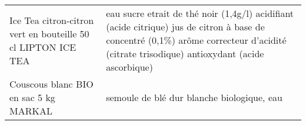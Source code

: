 \begin{longtable}{p{5cm}p{10cm}}
                                             Ice Tea citron-citron vert en bouteille 50 cl LIPTON ICE TEA &                                                                                                                                                                                                                                                                                                                                                                                                                                                                                                                                                                                                                                                                                                                                                                                                                                         eau  sucre  etrait de thé noir (1,4g/l)  acidifiant (acide citrique)  jus de citron à base de concentré (0,1\%)  arôme  correcteur d'acidité (citrate trisodique)  antioxydant (acide ascorbique) \\
                                                                    Couscous blanc BIO en sac 5 kg MARKAL &                                                                                                                                                                                                                                                                                                                                                                                                                                                                                                                                                                                                                                                                                                                                                                                                                                                                                                                                                                                               semoule de blé dur blanche biologique, eau \\

\end{longtable}
